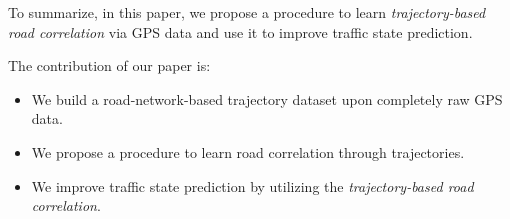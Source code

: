 To summarize, in this paper, we propose a procedure to learn \textit{trajectory-based road correlation} via GPS data and use it to improve traffic state prediction.

The contribution of our paper is:
\begin{itemize}
    \item We build a road-network-based trajectory dataset upon completely raw GPS data.
    \item We propose a procedure to learn road correlation through trajectories.
    \item We improve traffic state prediction by utilizing the \textit{trajectory-based road correlation}.
\end{itemize}
